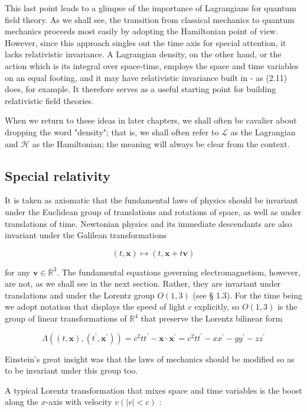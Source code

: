 \documentclass[10pt, letterpaper]{article}
\begin{document}
This last point leads to a glimpse of the importance of Lagrangians for quantum field theory. As we shall see, the transition from classical mechanics to quantum mechanics proceeds most easily by adopting the Hamiltonian point of view. However, since this approach singles out the time axis for special attention, it lacks relativistic invariance. A Lagrangian density, on the other hand, or the action which is its integral over space-time, employs the space and time variables on an equal footing, and it may have relativistic invariance built in - as (2.11) does, for example. It therefore serves as a useful starting point for building relativistic field theories.

When we return to these ideas in later chapters, we shall often be cavalier about dropping the word "density"; that is, we shall often refer to $\mathcal{L}$ as the Lagrangian and $\mathcal{H}$ as the Hamiltonian; the meaning will always be clear from the context.

\subsection*{Special relativity}
It is taken as axiomatic that the fundamental laws of physics should be invariant under the Euclidean group of translations and rotations of space, as well as under translations of time. Newtonian physics and its immediate descendants are also invariant under the Galilean transformations

$$
(t, \mathbf{x}) \mapsto(t, \mathbf{x}+t \mathbf{v})
$$

for any $\mathbf{v} \in \mathbb{R}^{3}$. The fundamental equations governing electromagnetism, however, are not, as we shall see in the next section. Rather, they are invariant under translations and under the Lorentz group $O(1,3)$ (see § 1.3). For the time being we adopt notation that displays the speed of light $c$ explicitly, so $O(1,3)$ is the group of linear transformations of $\mathbb{R}^{4}$ that preserve the Lorentz bilinear form

$$
\Lambda\left((t, \mathbf{x}),\left(t^{\prime}, \mathbf{x}^{\prime}\right)\right)=c^{2} t t^{\prime}-\mathbf{x} \cdot \mathbf{x}^{\prime}=c^{2} t t^{\prime}-x x^{\prime}-y y^{\prime}-z z^{\prime}
$$

Einstein's great insight was that the laws of mechanics should be modified so as to be invariant under this group too.

A typical Lorentz transformation that mixes space and time variables is the boost along the $x$-axis with velocity $v(|v|<c)$ :
\end{document}
